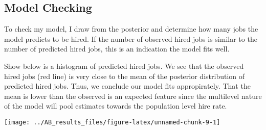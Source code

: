 \documentclass[]{article}
\begin{document}
\hypertarget{model-checking}{%
\subsection{Model Checking}\label{model-checking}}

To check my model, I draw from the posterior and determine how many jobs
the model predicts to be hired. If the number of observed hired jobs is
similar to the number of predicted hired jobs, this is an indication the
model fits well.

Show below is a histogram of predicted hired jobs. We see that the
observed hired jobs (red line) is very close to the mean of the
posterior distribution of predicted hired jobs. Thus, we conclude our
model fits appropirately. That the mean is lower than the observed is an
expected feature since the multilevel nature of the model will pool
estimates towards the population level hire rate.

\begin{center}\texttt{[image: ../AB\_results\_files/figure-latex/unnamed-chunk-9-1]} \end{center}
\end{document}
